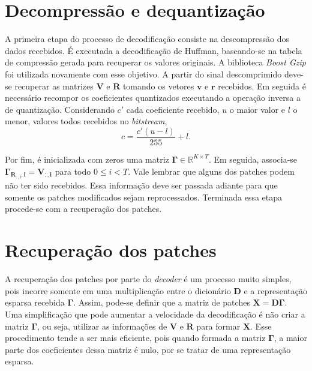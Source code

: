 \documentclass[cic,tc]{iiufrgs}
\renewcommand{\vec}[1]{\bm{#1}}
\newcommand{\mat}[1]{\bm{#1}}
\begin{document}

\section{Decompressão e dequantização}
\label{sec:decdeq}

A primeira etapa do processo de decodificação consiste na descompressão dos dados recebidos. 
É executada a decodificação de Huffman, 
baseando-se na tabela de compressão gerada para recuperar os valores originais.
A biblioteca \textit{Boost Gzip} \cite{Boost} foi utilizada novamente com esse objetivo.
A partir do sinal descomprimido deve-se recuperar as matrizes $\mat{V}$ e $\mat{R}$
tomando os vetores $\vec{v}$ e $\vec{r}$ recebidos.
Em seguida é necessário recompor os coeficientes quantizados 
executando a operação inversa a de quantização.
Considerando $c'$ cada coeficiente recebido, $u$ o maior valor e $l$ o menor, 
valores todos recebidos no \textit{bitstream},
\begin{equation*}
    c = \frac{c' (u - l)}{255} + l.
\end{equation*}

Por fim, é inicializada com zeros uma matriz $\mat{\Gamma} \in \mathbb{R}^{K \times T}$.
Em seguida, associa-se $\mat{\Gamma_{\mat{R_{:,i}}, i}} = \mat{V_{:,i}}$ para todo $0 \le i < T$.
Vale lembrar que alguns dos patches podem não ter sido recebidos. 
Essa informação deve ser passada adiante para que somente os patches modificados
sejam reprocessados.
Terminada essa etapa procede-se com a recuperação dos patches.

\section{Recuperação dos patches}
A recuperação dos patches por parte do \textit{decoder} é um processo muito simples,
pois incorre somente em uma multiplicação entre o dicionário $\mat{D}$ e a 
representação esparsa recebida $\mat{\Gamma}$.
Assim, pode-se definir que a matriz de patches $\mat{X} = \mat{D} \mat{\Gamma}$.
Uma simplificação que pode aumentar a velocidade da decodificação é não criar a matriz $\mat{\Gamma}$,
ou seja, utilizar as informações de $\mat{V}$ e $\mat{R}$ para formar $\mat{X}$. 
Esse procedimento tende a ser mais eficiente, pois quando formada a matriz $\mat{\Gamma}$, 
a maior parte dos coeficientes dessa matriz é nulo, por se tratar de uma representação esparsa.
\end{document}
